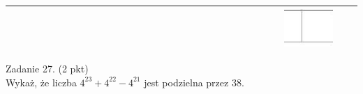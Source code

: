 \documentclass[10pt]{article}
\begin{document}
\begin{center}
\begin{tabular}{|c|c|c|c|c|c|c|c|c|c|c|c|c|c|c|c|c|c|c|c|c|c|c|c|c|c|c|c|c|c|c|}
\hline
 &  &  &  &  &  &  &  &  &  &  &  &  &  &  &  &  &  &  &  &  &  &  &  &  &  &  &  & \includegraphics[max width=\textwidth]{2024_11_21_23d228cacd5e4a9a3f86g-08}
 &  &  \\
\hline
\end{tabular}
\end{center}

Zadanie 27. (2 pkt)\\
Wykaż, że liczba \(4^{23}+4^{22}-4^{21}\) jest podzielna przez 38.
\end{document}
